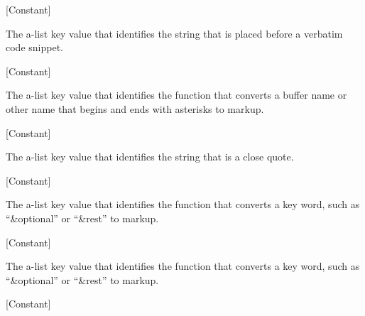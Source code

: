 \vspace{1em}
\noindent
{}
\usebox{\funcname}
 \hfill [Constant]

\begin{doc-string}
The a-list key value that identifies the string that is placed before a verbatim
code snippet.
\end{doc-string}

\vspace{1em}
\noindent
{}
\usebox{\funcname}
 \hfill [Constant]

\begin{doc-string}
The a-list key value that identifies the function that converts a buffer name or
other name that begins and ends with asterisks to markup.
\end{doc-string}

\vspace{1em}
\noindent
{}
\usebox{\funcname}
 \hfill [Constant]

\begin{doc-string}
The a-list key value that identifies the string that is a close quote.
\end{doc-string}

\vspace{1em}
\noindent
{}
\usebox{\funcname}
 \hfill [Constant]

\begin{doc-string}
The a-list key value that identifies the function that converts a key word, such
as ``\&optional'' or ``\&rest'' to markup.
\end{doc-string}

\vspace{1em}
\noindent
{}
\usebox{\funcname}
 \hfill [Constant]

\begin{doc-string}
The a-list key value that identifies the function that converts a key word, such
as ``\&optional'' or ``\&rest'' to markup.
\end{doc-string}

\vspace{1em}
\noindent
{}
\usebox{\funcname}
 \hfill [Constant]


